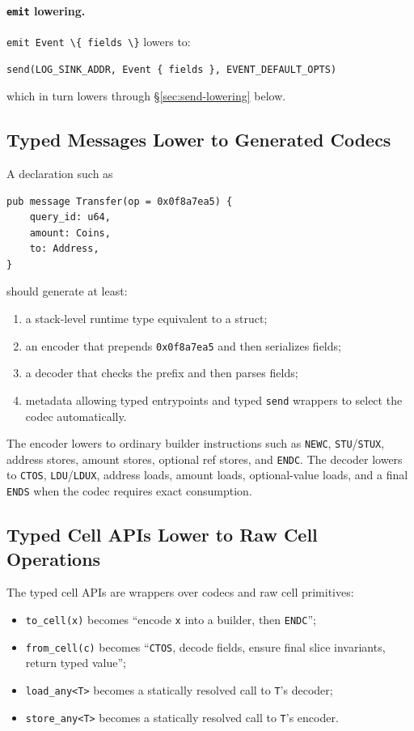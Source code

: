 \documentclass[12pt,oneside]{article}
\begin{document}
\paragraph{\texttt{emit} lowering.}
\verb|emit Event \{ fields \}| lowers to:

\begin{verbatim}
send(LOG_SINK_ADDR, Event { fields }, EVENT_DEFAULT_OPTS)
\end{verbatim}

which in turn lowers through \S\ref{sec:send-lowering} below.

\subsection{Typed Messages Lower to Generated Codecs}
A declaration such as

\begin{verbatim}
pub message Transfer(op = 0x0f8a7ea5) {
    query_id: u64,
    amount: Coins,
    to: Address,
}
\end{verbatim}

should generate at least:

\begin{enumerate}
\item a stack-level runtime type equivalent to a struct;
\item an encoder that prepends \verb|0x0f8a7ea5| and then serializes fields;
\item a decoder that checks the prefix and then parses fields;
\item metadata allowing typed entrypoints and typed \verb|send| wrappers to
select the codec automatically.
\end{enumerate}

The encoder lowers to ordinary builder instructions such as \verb|NEWC|,
\verb|STU|/\verb|STUX|, address stores, amount stores, optional ref stores, and
\verb|ENDC|. The decoder lowers to \verb|CTOS|, \verb|LDU|/\verb|LDUX|,
address loads, amount loads, optional-value loads, and a final \verb|ENDS| when
the codec requires exact consumption.

\subsection{Typed Cell APIs Lower to Raw Cell Operations}
The typed cell APIs are wrappers over codecs and raw cell primitives:

\begin{itemize}
\item \verb|to_cell(x)| becomes ``encode \verb|x| into a builder, then
\verb|ENDC|'';
\item \verb|from_cell(c)| becomes ``\verb|CTOS|, decode fields, ensure final
slice invariants, return typed value'';
\item \verb|load_any<T>| becomes a statically resolved call to \verb|T|'s
decoder;
\item \verb|store_any<T>| becomes a statically resolved call to \verb|T|'s
encoder.
\end{itemize}
\end{document}
